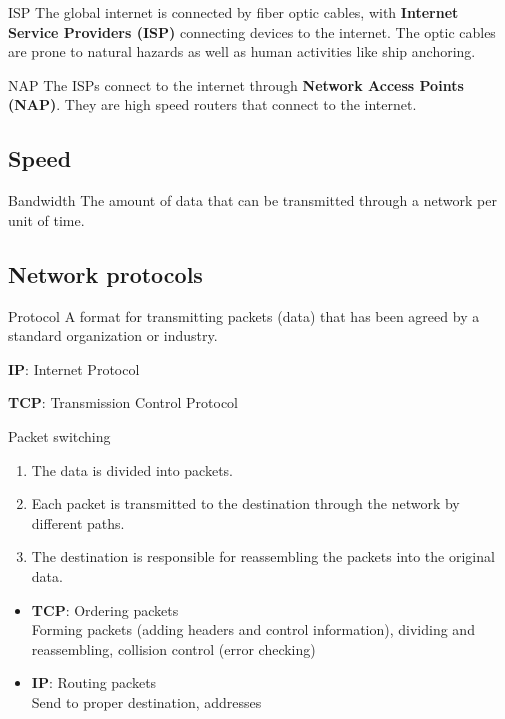 \documentclass{article}
\begin{document}
\begin{definition}
    {ISP}
    The global internet is connected by fiber optic cables, with \textbf{Internet Service Providers (ISP)} connecting devices to the internet. The optic cables are prone to natural hazards as well as human activities like ship anchoring.
\end{definition}

\begin{definition}
    {NAP}
    The ISPs connect to the internet through \textbf{Network Access Points (NAP)}. They are high speed routers that connect to the internet.
\end{definition}

\subsection{Speed}

\begin{definition}
    {Bandwidth}
    The amount of data that can be transmitted through a network per unit of time.
\end{definition}

\subsection{Network protocols}

\begin{definition}
    {Protocol}
    A format for transmitting packets (data) that has been agreed by a standard organization or industry.

    \textbf{IP}: Internet Protocol

    \textbf{TCP}: Transmission Control Protocol
\end{definition}

\begin{theorem}
    {Packet switching}
    \begin{enumerate}
        \item The data is divided into packets.
        \item Each packet is transmitted to the destination through the network by different paths.
        \item The destination is responsible for reassembling the packets into the original data.
    \end{enumerate}
    \begin{itemize}
        \item \textbf{TCP}: Ordering packets\\
              Forming packets (adding headers and control information), dividing and reassembling, collision control (error checking)
        \item \textbf{IP}: Routing packets\\
              Send to proper destination, addresses
    \end{itemize}
\end{theorem}
\end{document}
